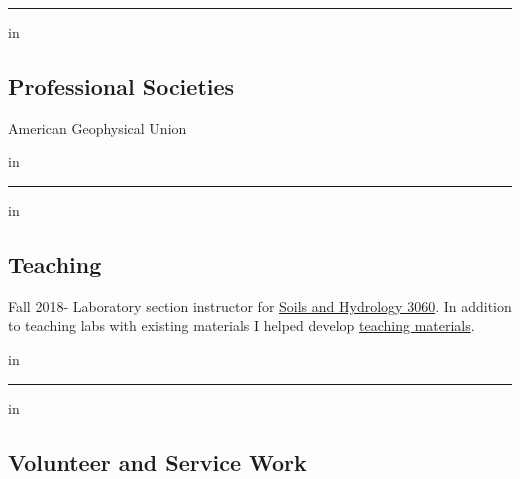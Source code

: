 \documentclass[10pt,letterpaper]{article}
\begin{document}
\hrule
\vspace{-0.4em}
 in
\subsection*{Professional Societies}

	American Geophysical Union

 in

\hrule
\vspace{-0.4em}
 in
\subsection*{Teaching}

Fall 2018- Laboratory section instructor for \href{http://www.hydrology.uga.edu/rasmussen/class/3060/index.html}{Soils and Hydrology 3060}. In addition to teaching labs with existing materials I helped develop \href{https://seyounger.github.io/soils_and_hydro_teaching/}{teaching materials}.

 in

\hrule
\vspace{-0.4em}
 in
\subsection*{Volunteer and Service Work}
\end{document}

